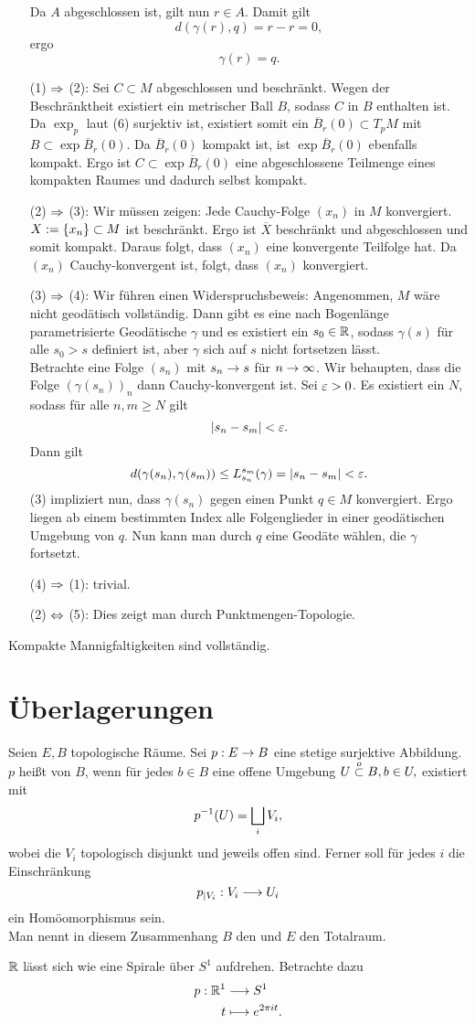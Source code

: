 \begin{Beweis}{}
\begin{enumerate}
	 Da $A$ abgeschlossen ist, gilt nun $r \in A$. Damit gilt
	 \[ d(\gamma(r), q) = r- r = 0, \]
	 ergo
	 \[ \gamma(r) = q. \]
	 \item[(1) $\overset{}{\Rightarrow}$ (2):] Sei $C \subset M$ abgeschlossen und beschränkt. Wegen der Beschränktheit existiert ein metrischer Ball $B$, sodass $C$ in $B$ enthalten ist. Da $\exp_p$ laut (6) surjektiv ist, existiert somit ein $\overline{B}_r(0) \subset T_pM$ mit $B \subset \exp \overline{B}_r(0)$. Da $\overline{B}_r(0)$ kompakt ist, ist $\exp \overline{B}_r(0)$ ebenfalls kompakt. Ergo ist $C \subset \exp \overline{B}_r(0)$ eine abgeschlossene Teilmenge eines kompakten Raumes und dadurch selbst kompakt.
	 \item[(2) $\overset{}{\Rightarrow}$ (3):] Wir müssen zeigen: Jede Cauchy-Folge $(x_n)$ in $M$ konvergiert.\\
	 $X := \set{x_n}{}\subset M$ ist beschränkt. Ergo ist $\overline{X}$ beschränkt und abgeschlossen und somit kompakt. Daraus folgt, dass $(x_n)$ eine konvergente Teilfolge hat. Da $(x_n)$ Cauchy-konvergent ist, folgt, dass $(x_n)$ konvergiert.
	 \item[(3) $\overset{}{\Rightarrow}$ (4):] Wir führen einen Widerspruchsbeweis: Angenommen, $M$ wäre nicht geodätisch vollständig. Dann gibt es eine nach Bogenlänge parametrisierte Geodätische $\gamma$ und es existiert ein $s_0 \in \mathbb{R}$, sodass $\gamma(s)$ für alle $s_0 > s$ definiert ist, aber $\gamma$ sich auf $s$ nicht fortsetzen lässt.\\
	 Betrachte eine Folge $(s_n)$ mit $s_n \overset{}{\rightarrow} s$ für $n \overset{}{\rightarrow} \infty $. Wir behaupten, dass die Folge $(\gamma(s_n))_n$ dann Cauchy-konvergent ist. Sei $\varepsilon > 0$. Es existiert ein $N$, sodass für alle $n,m \geq N$ gilt
	 \[ \left|s_n - s_m\right| < \varepsilon. \]
	 Dann gilt
	 \[ d(\gamma(s_n), \gamma(s_m)) \leq L_{s_n}^{s_m}(\gamma) = \left|s_n - s_m\right| < \varepsilon. \]
	 (3) impliziert nun, dass $\gamma(s_n)$ gegen einen Punkt $q \in M$ konvergiert. Ergo liegen ab einem bestimmten Index alle Folgenglieder in einer geodätischen Umgebung von $q$. Nun kann man durch $q$ eine Geodäte wählen, die $\gamma$ fortsetzt.
	 \item[(4) $\overset{}{\Rightarrow}$ (1):] trivial.
	 \item[(2) $\overset{}{\Leftrightarrow}$ (5):] Dies zeigt man durch Punktmengen-Topologie.
\end{enumerate}
\end{Beweis}

\Kor{}
Kompakte Mannigfaltigkeiten sind vollständig.

\newpage
\section{Überlagerungen}
Seien $E,B$ topologische Räume. Sei $p : E \overset{}{\rightarrow} B$ eine stetige surjektive Abbildung.
\Def{}
$p$ heißt  von $B$, wenn für jedes $b \in B$ eine offene Umgebung $U \overset{o}{\subset} B, b \in U,$ existiert mit
\[ p^{-1}(U) = \bigsqcup_i V_i, \]
wobei die $V_i$ topologisch disjunkt und jeweils offen sind. Ferner soll für jedes $i$ die Einschränkung
\[ p_{|V_i} : V_i \overset{}{\longrightarrow} U_i \]
ein Homöomorphismus sein.\\
Man nennt in diesem Zusammenhang $B$ den  und $E$ den Totalraum.

\Bsp{}
$\mathbb{R}$ lässt sich wie eine Spirale über $S^1$ aufdrehen. Betrachte dazu
\begin{align*}
p : \mathbb{R}^1 & \overset{}{\longrightarrow} S^1\\
t & \longmapsto e^{2\pi i t}.
\end{align*}